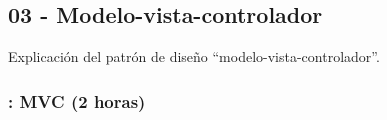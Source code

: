 \documentclass[a4paper,12pt]{article}
\begin{document}




\subsection{03 - Modelo-vista-controlador}

Explicación del patrón de diseño ``modelo-vista-controlador''.

\subsubsection{\lunesH: MVC (2 horas)}
\label{cal:lunesH}
\end{document}
